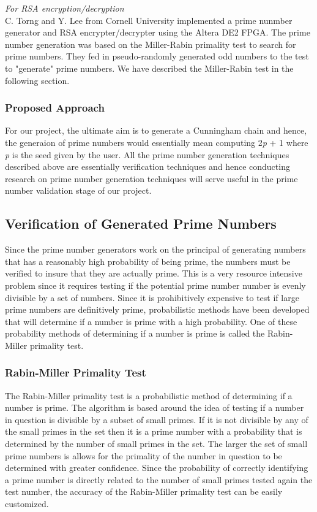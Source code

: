 \documentclass[journal]{IEEEtran}
\begin{document}
\textit{For RSA encryption/decryption}\\
C. Torng and Y. Lee from Cornell University implemented a prime nunmber generator and RSA encrypter/decrypter using the Altera DE2 FPGA. The prime number generation was based on the Miller-Rabin primality test to search for prime numbers. They fed in pseudo-randomly generated odd numbers to the test to "generate" prime numbers. We have described the Miller-Rabin test in the following section.\\  

\subsubsection{Proposed Approach}

For our project, the ultimate aim is to generate a Cunningham chain and hence, the generaion of prime numbers would essentially mean computing 2\textit{p} + 1 where \textit{p} is the seed given by the user. All the prime number generation techniques described above are essentially verification techniques and hence conducting research on prime number generation techniques will serve useful in the prime number validation stage of our project.\\

\subsection{Verification of Generated Prime Numbers}
Since the prime number generators work on the principal of generating numbers that has a reasonably high probability of being prime, the numbers must be verified to insure that they are actually prime. This is a very resource intensive problem since it requires testing if the potential prime number number is evenly divisible by a set of numbers. Since it is prohibitively expensive to test if large prime numbers are definitively prime, probabilistic methods have been developed that will determine if a number is prime with a high probability. One of these probability methods of determining if a number is prime is called the Rabin-Miller primality test. \\

\subsubsection{Rabin-Miller Primality Test}
The Rabin-Miller primality test is a probabilistic method of determining if a number is prime. The algorithm is based around the idea of testing if a number in question is divisible by a subset of small primes. If it is not divisible by any of the small primes in the set then it is a prime number with a probability that is determined by the number of small primes in the set. The larger the set of small prime numbers is allows for the primality of the number in question to be determined with greater confidence. Since the probability of correctly identifying a prime number is directly related to the number of small primes tested again the test number, the accuracy of the Rabin-Miller primality test can be easily customized. \cite{cheung} \\
\end{document}
